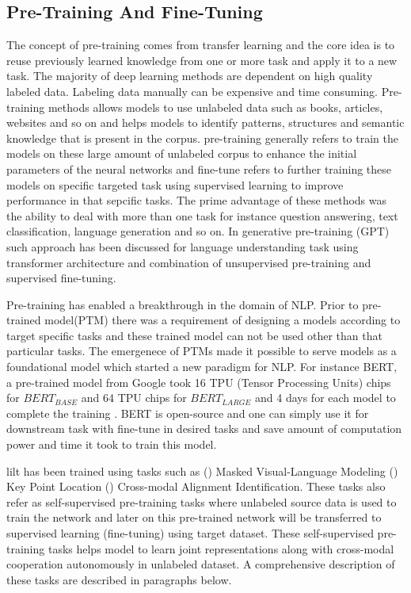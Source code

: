 \subsection{Pre-Training And Fine-Tuning}

The concept of pre-training comes from transfer learning \cite{Transfer_learning} and the core idea is to reuse previously learned knowledge from one or more task and apply it to a new task. The majority of deep learning methods are dependent on high quality labeled data. Labeling data manually can be expensive and time consuming. Pre-training methods allows models to use unlabeled data such as books, articles, websites and so on and helps models to identify patterns, structures and semantic knowledge that is present in the corpus. pre-training generally refers to train the models on these large amount of unlabeled corpus to enhance the initial parameters of the neural networks and fine-tune refers to further training these models on specific targeted task using supervised learning to improve performance in that sepcific tasks. The prime advantage of these methods was the ability to deal with more than one task for instance question answering, text classification, language generation and so on. In generative pre-training (GPT) \cite{radford2018improving} such approach has been discussed for language understanding task using transformer architecture and combination of unsupervised pre-training and supervised fine-tuning.

Pre-training has enabled a breakthrough in the domain of NLP. Prior to pre-trained model(PTM) there was a requirement of designing a models according to target specific tasks and these trained model can not be used other than that particular tasks. The emergenece of PTMs made it possible to serve models as a foundational model which started a new paradigm for NLP. For instance BERT, a pre-trained model from Google took 16 TPU (Tensor Processing Units) chips for \(BERT_{BASE}\) and 64 TPU chips for \(BERT_{LARGE}\) and 4 days for each model to complete the training \cite{devlin2018bert}. BERT is open-source and one can simply use it for downstream task with fine-tune in desired tasks and save amount of computation power and time it took to train this model.

\acrshort{lilt} \cite{wang-etal-2022-lilt} has been trained using tasks such as () Masked Visual-Language Modeling () Key Point Location () Cross-modal Alignment Identification. These tasks also refer as self-supervised pre-training tasks where unlabeled source data is used to train the network and later on this pre-trained network will be transferred to supervised learning (fine-tuning) using target dataset. These self-supervised pre-training tasks helps model to learn joint representations along with cross-modal cooperation autonomously in unlabeled dataset. A comprehensive description of these tasks are described in paragraphs below. 

